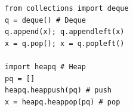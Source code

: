 \begin{verbatim}
from collections import deque
q = deque() # Deque
q.append(x); q.appendleft(x)
x = q.pop(); x = q.popleft()

import heapq # Heap
pq = []
heapq.heappush(pq) # push
x = heapq.heappop(pq) # pop
\end{verbatim}